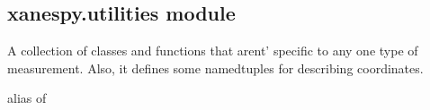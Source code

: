 \documentclass[letterpaper,10pt,english]{sphinxmanual}
\begin{document}
\begin{fulllineitems}
\begin{fulllineitems}
\label{\detokenize{xanespy:xanespy.txmstore.TXMStore.timestamps}}
\end{fulllineitems}


\begin{fulllineitems}
\label{\detokenize{xanespy:xanespy.txmstore.TXMStore.timestep_names}}
\end{fulllineitems}


\begin{fulllineitems}
\label{\detokenize{xanespy:xanespy.txmstore.TXMStore.whiteline_map}}
\end{fulllineitems}


\end{fulllineitems}



\subsection{xanespy.utilities module}
\label{\detokenize{xanespy:xanespy-utilities-module}}\label{\detokenize{xanespy:module-xanespy.utilities}}
A collection of classes and functions that arent' specific to any
one type of measurement. Also, it defines some namedtuples for
describing coordinates.

\begin{fulllineitems}
\label{\detokenize{xanespy:xanespy.utilities.Extent}}
alias of 

\end{fulllineitems}

\end{document}
